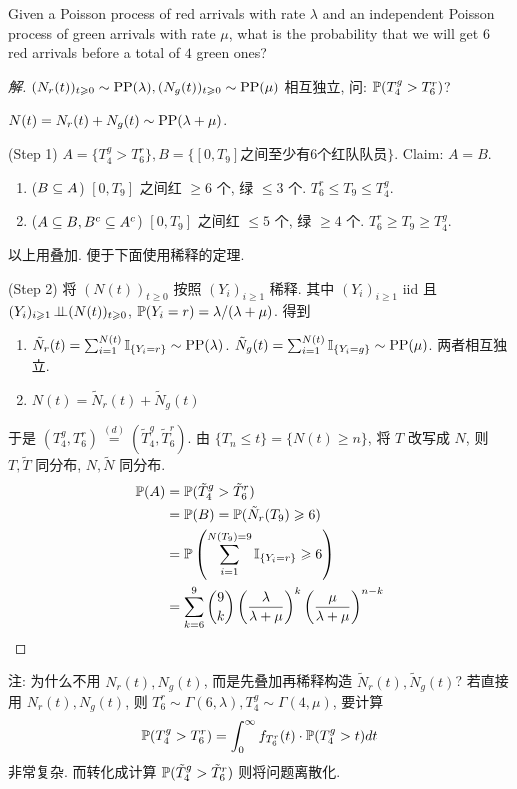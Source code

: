 \begin{example}
    Given a Poisson process of red arrivals with rate $\lambda$ and an independent Poisson process of green arrivals with rate $\mu$, what is the probability that we will get $6$ red arrivals before a total of $4$ green ones?
\end{example}
\begin{proof}[解]
    $(N_r(t))_{t\geqslant 0}\sim\operatorname{PP}(\lambda), (N_g(t))_{t\geqslant 0}\sim \operatorname{PP}(\mu)$ 相互独立, 问: $\mathbb{P}(T_4^g>T_6^r)$?

    $N(t)=N_r(t)+N_g(t)\sim \operatorname{PP}(\lambda +\mu)$.
    
    (Step 1) $A=\{T_4^g>T_6^r\}, B=\{[0,T_9]\text{之间至少有}6\text{个红队队员}\}$. Claim: $A=B$.
        \begin{enumerate}
            \item ($B\subseteq A$) $[0,T_9]$ 之间红 $\geq 6$ 个, 绿 $\leq 3$ 个. $T_6^r\leq T_9\leq T_4^g$.
            \item ($A\subseteq B, B^c\subseteq A^c$) $[0,T_9]$ 之间红 $\leq 5$ 个, 绿 $\geq 4$ 个. $T_6^r\geq T_9\geq T_4^g$.
        \end{enumerate}
        以上用叠加. 便于下面使用稀释的定理.
        
  (Step 2) 将 $(N(t))_{t\geq 0}$ 按照 $(Y_i)_{i\geq 1}$ 稀释. 其中 $(Y_i)_{i\geq 1}$ iid 且 $(Y_i)_{i\geqslant 1}\operatorname{\perp\!\!\!\perp} (N(t))_{t\geqslant 0}$, $\mathbb{P}(Y_i=r)=\lambda/(\lambda+\mu)$. 得到
        \begin{enumerate}
            \item $\tilde{N}_r(t)=\sum_{i=1}^{N(t)}\mathbb I_{\{Y_i=r\}}\sim\operatorname{PP}(\lambda)$. $\tilde{N}_g(t)=\sum_{i=1}^{N(t)}\mathbb I_{\{Y_i=g\}}\sim\operatorname{PP}(\mu)$. 两者相互独立.
            \item $N(t)=\tilde{N}_r(t)+\tilde{N}_g(t)$
        \end{enumerate}
        于是 $(T_4^g, T_6^r)\overset{(d)}{=}(\tilde{T}_4^g,\tilde{T}_6^r)$. 由 $\{T_n\leq t\}=\{N(t)\geq n\}$, 将 $T$ 改写成 $N$, 则 $T,\tilde{T}$ 同分布, $N,\tilde{N}$ 同分布.
        \[
        \begin{aligned}
            \mathbb{P}(A) &=\mathbb{P}(\tilde{T}_4^g>\tilde{T}_6^r)\\
            &=\mathbb{P}(B)=\mathbb{P}(\tilde{N}_r(T_9)\geqslant 6)\\
            &=\mathbb{P}\left(\sum_{i=1}^{N(T_9)=9}\mathbb I_{\{Y_i=r\}}\geqslant 6\right)\\
            &=\sum_{k=6}^9\binom{9}{k}\left(\frac{\lambda}{\lambda+\mu}\right)^{k}\left(\frac{\mu}{\lambda+\mu}\right)^{n-k}
        \end{aligned}
        \]
\end{proof}
注: 为什么不用 $N_r(t),N_g(t)$, 而是先叠加再稀释构造 $\tilde{N}_r(t),\tilde{N}_g(t)$? 若直接用 $N_r(t),N_g(t)$, 则 $T_6^r\sim\Gamma(6,\lambda), T_4^g\sim\Gamma(4,\mu)$, 要计算
\[
\mathbb{P}(T_4^g>T_6^r)=\int_0^{\infty}f_{T_6^r}(t)\cdot \mathbb{P}(T_4^g>t)dt
\]
非常复杂. 而转化成计算 $\mathbb{P}(\tilde{T}_4^g>\tilde{T}_6^r)$ 则将问题离散化.

